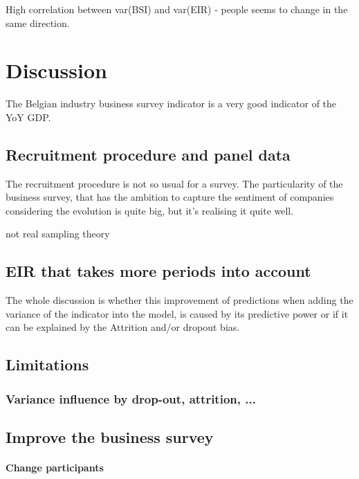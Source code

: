 \documentclass[12pt,a4paper,oneside]{book}
\begin{document}
High correlation between var(BSI) and var(EIR) - people seems to change in the same direction.


\chapter{Discussion}

The Belgian industry business survey indicator is a very good indicator of the YoY GDP.




\section*{Recruitment procedure and panel data}

The recruitment procedure is not so usual for a survey. The particularity of the business survey, that has the ambition to capture the sentiment of companies considering the evolution is quite big, but it's realising it quite well.

not real sampling theory



\section*{EIR that takes more periods into account}

The whole discussion is whether this improvement of predictions when adding the variance of the indicator into the model, is caused by its predictive power or if it can be explained by the Attrition and/or dropout bias.

\section*{Limitations}

\subsection*{Variance influence by drop-out, attrition, ...}

\section*{Improve the business survey}




\subsubsection*{Change participants}
\end{document}
